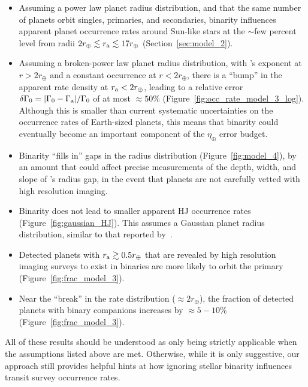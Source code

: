 \documentclass[12pt,modern]{aastex61}
\renewcommand{\a}{_{\rm a}}
\begin{document}
\begin{itemize}
%
\item Assuming a power law planet radius distribution, and that the
  same number of planets orbit singles, primaries, and secondaries,
    binarity influences apparent planet occurrence rates around
    Sun-like stars at the $\sim$few percent level from radii
    $2r_\oplus \lesssim r\a \lesssim 17r_\oplus$
    (Section~\ref{sec:model_2}).
%
\item Assuming a broken-power law planet radius distribution, with
  \citet{howard_planet_2012}'s exponent at $r > 2r_\oplus$ and a
    constant occurrence at $r < 2r_\oplus$, there is a ``bump'' in the
    apparent rate density at $r\a < 2r_\oplus$, leading to a relative
    error $\delta \Gamma_0 = |\Gamma_0 - \Gamma\a|/\Gamma_0$ of at
    most $\approx 50\%$ (Figure~\ref{fig:occ_rate_model_3_log}).
    Although this is smaller than current systematic uncertainties on
    the occurrence rates of Earth-sized planets, this means that
    binarity could eventually become an important component of the
    $\eta_\oplus$ error budget.
%
\item Binarity ``fills in'' gaps in the radius distribution
  (Figure~\ref{fig:model_4}), by an amount that could affect precise
    measurements of the depth, width, and slope of
    \citet{fulton_california-_2017}'s radius gap, in the event that
    planets are not carefully vetted with high resolution imaging.
%
\item Binarity does not lead to smaller apparent HJ occurrence rates
  (Figure~\ref{fig:gaussian_HJ}).  This assumes a Gaussian planet
    radius distribution, similar to that reported
    by~\citet{petigura_CKS_2017}.
%
\item Detected planets with $r\a \gtrsim 0.5r_\oplus$ that are
  revealed by high resolution imaging surveys to exist in binaries are
    more likely to orbit the primary (Figure~\ref{fig:frac_model_3}).
%
\item Near the ``break'' in the rate distribution ($\approx
  2r_\oplus$), the fraction of detected planets with binary companions
    increases by $\approx 5-10\%$ (Figure~\ref{fig:frac_model_3}).
\end{itemize}

All of these results should be understood as only being strictly
applicable when the assumptions listed above are met.  Otherwise,
while it is only suggestive, our approach still provides helpful hints
at how ignoring stellar binarity influences transit survey occurrence
rates.
\end{document}
